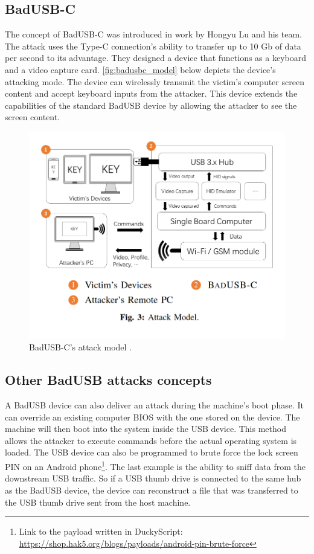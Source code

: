 \subsection*{BadUSB-C}
The concept of BadUSB-C was introduced in work by Hongyu Lu and his team\cite{badusbc}. The attack uses the Type-C connection's ability to transfer up to 10 Gb of data per second to its advantage. They designed a device that functions as a keyboard and a video capture card. \autoref{fig:badusbc_model} below depicts the device's attacking mode. The device can wirelessly transmit the victim's computer screen content and accept keyboard inputs from the attacker. This device extends the capabilities of the standard BadUSB device by allowing the attacker to see the screen content.
\begin{figure}[ht]
    \centering
    \includegraphics[width=0.7\linewidth]{obrazky-figures/badusbc_attack.png}
    \caption{BadUSB-C's attack model \cite{badusbc}.}
    \label{fig:badusbc_model}
\end{figure}

\subsection*{Other BadUSB attacks concepts}
A BadUSB device can also deliver an attack during the machine's boot phase. It can override an existing computer BIOS with the one stored on the device. The machine will then boot into the system inside the USB device. This method allows the attacker to execute commands before the actual operating system is loaded. The USB device can also be programmed to brute force the lock screen PIN on an Android phone\footnote{Link to the payload written in DuckyScript: \url{https://shop.hak5.org/blogs/payloads/android-pin-brute-force}}. The last example is the ability to sniff data from the downstream USB traffic. So if a USB thumb drive is connected to the same hub as the BadUSB device, the device can reconstruct a file that was transferred to the USB thumb drive sent from the host machine.

